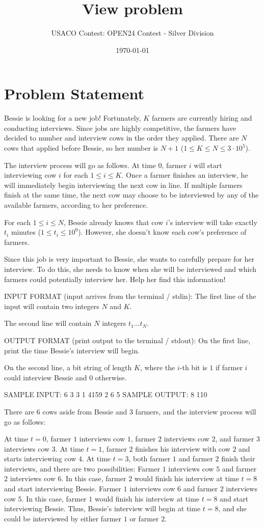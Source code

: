 \documentclass[12pt]{article}
\title{View problem}
\author{USACO Contest: OPEN24 Contest - Silver Division}
\date{\today}
\begin{document}
\maketitle

\section*{Problem Statement}


Bessie is looking for a new job! Fortunately, $K$ farmers are currently hiring
and conducting interviews. Since jobs are highly competitive, the farmers have
decided to number and interview cows in the order they applied. There are $N$
cows that applied before Bessie, so her number is $N+1$ 
($1 \leq K \leq N \leq 3 \cdot 10^5$).

The interview process will go as follows. At time $0$, farmer $i$ will start
interviewing cow $i$ for each $1 \leq i \leq K$. Once a farmer finishes an
interview, he will immediately begin interviewing the next cow in line. If
multiple farmers finish at the same time, the next cow may choose to be
interviewed by any of the available farmers, according to her preference.

For each $1\le i\le N$, Bessie already knows that cow $i$'s interview will take
exactly $t_i$ minutes ($1 \leq t_i \leq 10^9$). However, she doesn't know each
cow's preference of farmers.

Since this job is very important to Bessie, she wants to carefully prepare for
her interview. To do this, she needs to know when she will be interviewed and
which farmers could potentially interview her. Help her find this information!

INPUT FORMAT (input arrives from the terminal / stdin):
The first line of the input will contain two integers $N$ and $K$.

The second line will contain $N$ integers $t_1 \dots t_N$.

OUTPUT FORMAT (print output to the terminal / stdout):
On the first line, print the time Bessie's interview will begin.

On the second line, a bit string of length $K$, where the $i$-th bit is $1$ if
farmer $i$ could interview Bessie and $0$ otherwise.

SAMPLE INPUT:
6 3
3 1 4159 2 6 5
SAMPLE OUTPUT: 
8
110

There are $6$ cows aside from Bessie and $3$ farmers, and the interview process will go as
follows:

 At time $t = 0$, farmer $1$ interviews cow $1$, farmer $2$ interviews cow
$2$, and farmer $3$ interviews cow $3$. At time $t = 1$, farmer $2$
finishes his interview with cow $2$ and starts interviewing cow $4$.
At time $t = 3$, both farmer $1$ and farmer $2$ finish their interviews, and
there are two possibilities:    Farmer $1$ interviews cow $5$ and
farmer $2$ interviews cow $6$. In this case, farmer $2$ would finish his
interview at time $t = 8$ and start interviewing Bessie. Farmer
$1$ interviews cow $6$ and farmer $2$ interviews cow $5$. In this case, farmer
$1$ would finish his interview at time $t = 8$ and start interviewing
Bessie. 
Thus, Bessie's interview will begin at time $t = 8$, and she could be
interviewed by either farmer $1$ or farmer $2$.
\end{document}
